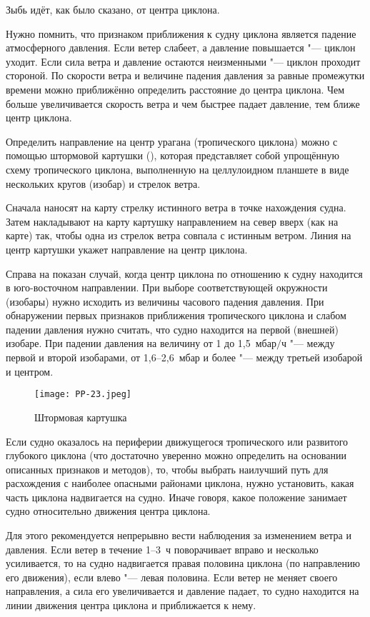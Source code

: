 Зыбь идёт, как было сказано, от центра циклона.

Нужно помнить, что признаком приближения к судну циклона является
падение атмосферного давления. Если ветер слабеет, а давление
повышается "--- циклон уходит. Если сила ветра и давление остаются
неизменными "--- циклон проходит стороной. По скорости ветра и величине
падения давления за равные промежутки времени можно приближённо
определить расстояние до центра циклона. Чем больше увеличивается
скорость ветра и чем быстрее падает давление, тем ближе центр циклона.

Определить направление на центр урагана (тропического циклона) можно с
помощью штормовой картушки (), которая представляет собой
упрощённую схему тропического циклона, выполненную на целлулоидном
планшете в виде нескольких кругов (изобар) и стрелок ветра.

Сначала наносят на карту стрелку истинного ветра в точке нахождения
судна. Затем накладывают на карту картушку направлением на север вверх
(как на карте) так, чтобы одна из стрелок ветра совпала с истинным
ветром. Линия на центр картушки укажет направление на центр циклона.

Справа на  показан случай, когда центр циклона по отношению
к судну находится в юго-восточном направлении. При выборе
соответствующей окружности (изобары) нужно исходить из величины
часового падения давления. При обнаружении первых признаков
приближения тропического циклона и слабом падении давления нужно
считать, что судно находится на первой (внешней) изобаре. При падении
давления на величину от 1 до 1,5~мбар$/$ч "--- между первой и второй
изобарами, от 1,6--2,6~мбар и более "--- между третьей изобарой и
центром.

\begin{figure}[htb]
  \centering{}
  \texttt{[image: PP-23.jpeg]}
  \caption{Штормовая картушка}
  \label{fig:pp23}
  \small
  \centering{}
\end{figure}

Если судно оказалось на периферии движущегося тропического или
развитого глубокого циклона (что достаточно уверенно можно определить
на основании описанных признаков и методов), то, чтобы выбрать
наилучший путь для расхождения с наиболее опасными районами циклона,
нужно установить, какая часть циклона надвигается на судно. Иначе
говоря, какое положение занимает судно относительно движения центра
циклона.

Для этого рекомендуется непрерывно вести наблюдения за изменением
ветра и давления. Если ветер в течение 1--3~ч поворачивает вправо и
несколько усиливается, то на судно надвигается правая половина циклона
(по направлению его движения), если влево "--- левая половина. Если ветер
не меняет своего направления, а сила его увеличивается и давление
падает, то судно находится на линии движения центра циклона и
приближается к нему.

